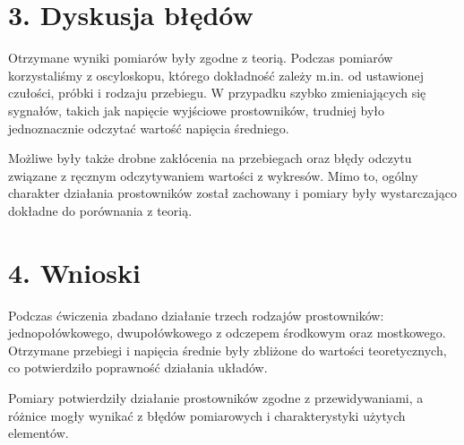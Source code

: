 \documentclass[a4paper,12pt]{article}
\begin{document}
\section*{3. Dyskusja błędów}

Otrzymane wyniki pomiarów były zgodne z teorią. Podczas pomiarów korzystaliśmy z oscyloskopu, którego dokładność zależy m.in. od ustawionej czułości, próbki i rodzaju przebiegu. W przypadku szybko zmieniających się sygnałów, takich jak napięcie wyjściowe prostowników, trudniej było jednoznacznie odczytać wartość napięcia średniego.

Możliwe były także drobne zakłócenia na przebiegach oraz błędy odczytu związane z ręcznym odczytywaniem wartości z wykresów. Mimo to, ogólny charakter działania prostowników został zachowany i pomiary były wystarczająco dokładne do porównania z teorią.

\section*{4. Wnioski}

Podczas ćwiczenia zbadano działanie trzech rodzajów prostowników: jednopołówkowego, dwupołówkowego z odczepem środkowym oraz mostkowego. Otrzymane przebiegi i napięcia średnie były zbliżone do wartości teoretycznych, co potwierdziło poprawność działania układów.

Pomiary potwierdziły działanie prostowników zgodne z przewidywaniami, a różnice mogły wynikać z błędów pomiarowych i charakterystyki użytych elementów.
\end{document}
